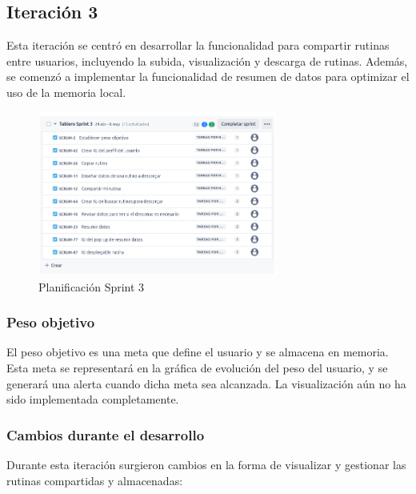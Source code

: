 \subsection*{Iteraci\'on 3}
Esta iteraci\'on se centr\'o en desarrollar la funcionalidad para compartir rutinas entre usuarios, incluyendo la subida, visualizaci\'on y descarga de rutinas. Adem\'as, se comenz\'o a implementar la funcionalidad de resumen de datos para optimizar el uso de la memoria local.

\begin{figure}[h!]
  \centering
  \includegraphics[width=0.7\textwidth]{fotos/PreSprint3.png}
  \caption{Planificaci\'on Sprint 3}
  \label{fig:pre_sprint3}
\end{figure}

\subsubsection*{Peso objetivo}
El peso objetivo es una meta que define el usuario y se almacena en memoria. Esta meta se representar\'a en la gr\'afica de evoluci\'on del peso del usuario, y se generar\'a una alerta cuando dicha meta sea alcanzada. La visualizaci\'on a\'un no ha sido implementada completamente.

\subsubsection*{Cambios durante el desarrollo}
Durante esta iteraci\'on surgieron cambios en la forma de visualizar y gestionar las rutinas compartidas y almacenadas:

